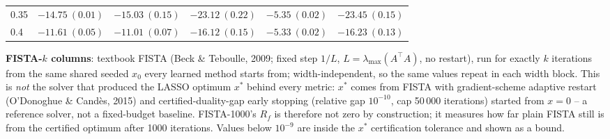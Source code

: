 \begin{table}[htbp]
\begin{tabular}{@{} l rrrrr @{}}
0.35 & $-14.75\ (0.01)$ & $-15.03\ (0.15)$ & $-23.12\ (0.22)$ & $-5.35\ (0.02)$ & $-23.45\ (0.15)$ \\
0.4 & $-11.61\ (0.05)$ & $-11.01\ (0.07)$ & $-16.12\ (0.15)$ & $-5.33\ (0.02)$ & $-16.23\ (0.13)$ \\
\bottomrule
\end{tabular}
\vspace{2pt}
\begin{minipage}{\linewidth}\footnotesize
\textbf{FISTA-$k$ columns}: textbook FISTA (Beck \& Teboulle, 2009; fixed step $1/L$, $L = \lambda_{\max}(A^\top A)$, no restart), run for exactly $k$ iterations from the same shared seeded $x_0$ every learned method starts from; width-independent, so the same values repeat in each width block. This is \emph{not} the solver that produced the LASSO optimum $x^*$ behind every metric: $x^*$ comes from FISTA with gradient-scheme adaptive restart (O'Donoghue \& Cand\`es, 2015) and certified-duality-gap early stopping (relative gap $10^{-10}$, cap 50\,000 iterations) started from $x = 0$ -- a reference solver, not a fixed-budget baseline. FISTA-1000's $R_f$ is therefore not zero by construction; it measures how far plain FISTA still is from the certified optimum after 1000 iterations. Values below $10^{-9}$ are inside the $x^*$ certification tolerance and shown as a bound.
\end{minipage}
\end{table}

